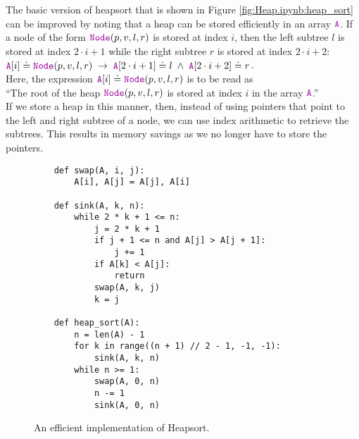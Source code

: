 The basic version of heapsort that is shown in Figure \ref{fig:Heap.ipynb:heap_sort} can be improved
by noting that a heap can be stored efficiently in an array $\mytt{A}$.  If a node of the form
$\mytt{Node}(p, v, l, r)$ is stored at index $i$, then the left subtree $l$ is stored at
index $2 \cdot i + 1$ while the right subtree $r$ is stored at index $2 \cdot i + 2$:
\\[0.2cm]
\hspace*{1.3cm}
$\mytt{A}[i] \doteq \mytt{Node}(p, v, l, r) \;\rightarrow\; \mytt{A}[2\cdot i + 1] \doteq l \;\wedge\; \mytt{A}[2\cdot i+2] \doteq r$.
\\[0.2cm]
Here, the expression $\mytt{A}[i] \doteq \mytt{Node}(p, v, l, r)$ is to be read as 
\\[0.2cm]
\hspace*{1.3cm}
``The root of the heap $\mytt{Node}(p, v, l, r)$ is stored at index $i$ in the array $\mytt{A}$.''
\\[0.2cm]
If we store a heap in this manner, then, instead of using pointers that point to the left and right
subtree of a node, we can use index arithmetic to retrieve the subtrees.  This results in memory savings as we
no longer have to store the pointers.


\begin{figure}[!ht]
\centering
\begin{verbatim}
    def swap(A, i, j):
        A[i], A[j] = A[j], A[i]
    
    def sink(A, k, n):
        while 2 * k + 1 <= n:
            j = 2 * k + 1
            if j + 1 <= n and A[j] > A[j + 1]:
                j += 1
            if A[k] < A[j]:
                return
            swap(A, k, j)
            k = j
    
    def heap_sort(A):
        n = len(A) - 1
        for k in range((n + 1) // 2 - 1, -1, -1):
            sink(A, k, n)
        while n >= 1:
            swap(A, 0, n)
            n -= 1
            sink(A, 0, n)
\end{verbatim}
\vspace*{-0.3cm}
\caption{An efficient implementation of Heapsort.}
\label{fig:Heapsort.ipynb}
\end{figure}



